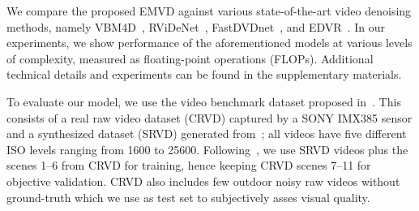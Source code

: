 \documentclass[final]{cvpr}
\begin{document}
    We compare the proposed EMVD against various state-of-the-art video denoising methods, namely VBM4D~\cite{maggioni2012vbm4d},  RViDeNet~\cite{yue2020supervised}, FastDVDnet~\cite{tassano2020fastdvdnet}, and EDVR~\cite{wang2019edvr}. In our experiments, we show performance of the aforementioned models at various levels of complexity, measured as floating-point operations (FLOPs). Additional technical details and experiments can be found in the supplementary materials.  
    
    To evaluate our model, we use the video benchmark dataset proposed in~\cite{yue2020supervised}. This consists of a real raw video dataset (CRVD) captured by a SONY IMX385 sensor and a synthesized dataset (SRVD) generated from~\cite{chen2018sid}; all videos have five different ISO levels ranging from 1600 to 25600. Following~\cite{yue2020supervised}, we use SRVD videos plus the scenes 1--6 from CRVD for training, hence keeping CRVD scenes 7--11 for objective validation. CRVD also includes few outdoor noisy raw videos without ground-truth which we use as test set to subjectively asses visual quality. 
\end{document}
